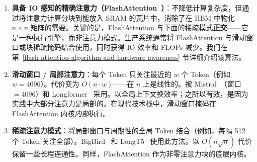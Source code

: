 \begin{enumerate}
  \item \textbf{具备 IO 感知的精确注意力（FlashAttention~\cite{dao2022flashattention}）}：不降低计算复杂度，但通过将注意力计算分块到能放入 SRAM 的瓦片中，消除了在 HBM 中物化 $n \times n$ 矩阵的需要。关键的是，FlashAttention 与下面的稀疏模式\textbf{正交}——它是一种执行引擎，而非注意力模式。生产系统通常将 FlashAttention 与滑动窗口或块稀疏掩码结合使用，同时获得 IO 效率和 FLOPs 减少。我们在第~\ref{flash-attention-algorithm-and-hardware-awareness} 节详细介绍该算法。
  \item \textbf{滑动窗口 / 局部注意力}：每个 Token 只关注最近的 $w$ 个 Token（例如 $w = 4096$）。代价变为 $O(n \cdot w)$——在 $n$ 上是线性的。被 Mistral~\cite{jiang2023mistral}（窗口 $= 4096$）和 Longformer~\cite{beltagy2020longformer} 采用。以全局上下文换效率；之所以有效，是因为实践中大部分注意力是局部的。在现代技术栈中，滑动窗口掩码在 FlashAttention 内核\emph{内部}执行。
  \item \textbf{稀疏注意力模式}：将局部窗口与周期性的全局 Token 结合（例如，每隔 512 个 Token 关注全部）。BigBird~\cite{zaheer2020bigbird} 和 LongT5~\cite{guo2022longt5} 使用此方法。以 $O(n\sqrt{n})$ 代价保留一些长程连通性。同样，FlashAttention 作为非零注意力块的底层内核。

\end{enumerate}
